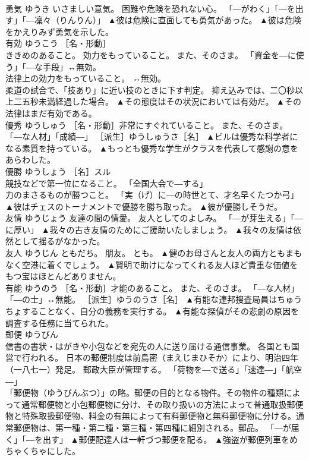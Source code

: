 \documentclass[8pt]{extreport}
\begin{document}
\begin{CJK}{UTF8}{min}
\\	勇気	ゆうき	いさましい意気。 困難や危険を恐れない心。 「―がわく」「―を出す」「―凜々（りんりん）」	▲彼は危険に直面しても勇気があった。 ▲彼は危険をかえりみず勇気を示した。
\\	有効	ゆうこう	［名・形動］ 
\\	ききめのあること。 効力をもっていること。 また、そのさま。 「資金を―に使う」「―な手段」↔無効。 
\\	法律上の効力をもっていること。 ↔無効。 
\\	柔道の試合で、「技あり」に近い技のときに下す判定。 抑え込みでは、二〇秒以上二五秒未満経過した場合。	▲その態度はその状況においては有効だ。 ▲その法律はまだ有効である。
\\	優秀	ゆうしゅう	［名・形動］非常にすぐれていること。 また、そのさま。 「―な人材」「成績―」 ［派生］ゆうしゅうさ［名］	▲ビルは優秀な科学者になる素質を持っている。 ▲もっとも優秀な学生がクラスを代表して感謝の意をあらわした。
\\	優勝	ゆうしょう	［名］スル 
\\	競技などで第一位になること。 「全国大会で―する」 
\\	力のまさるものが勝つこと。 「実（げ）に―の時世とて、才名早くたつか弓」	▲彼はチェスのトーナメントで優勝を勝ち取った。 ▲彼が優勝しそうだ。
\\	友情	ゆうじょう	友達の間の情愛。 友人としてのよしみ。 「―が芽生える」「―に厚い」	▲我々の古き友情のためにご援助いたしましょう。 ▲我々の友情は依然として揺るがなかった。
\\	友人	ゆうじん	ともだち。 朋友。 とも。	▲健のお母さんと友人の両方ともまもなく空港に着くでしょう。 ▲賢明で助けになってくれる友人ほど貴重な価値をもつ宝はほとんどありません。
\\	有能	ゆうのう	［名・形動］才能のあること。 また、そのさま。 「―な人材」「―の士」↔無能。 ［派生］ゆうのうさ［名］	▲有能な連邦捜査局員はちゅうちょすることなく、自分の義務を実行する。 ▲有能な探偵がその悲劇の原因を調査する任務に当てられた。
\\	郵便	ゆうびん	
\\	信書の書状・はがきや小包などを宛先の人に送り届ける通信事業。 各国とも国営で行われる。 日本の郵便制度は前島密（まえじまひそか）により、明治四年（一八七一）発足。 郵政大臣が管理する。 「荷物を―で送る」「速達―」「航空―」 
\\	「郵便物（ゆうびんぶつ）」の略。郵便の目的となる物件。その物件の種類によって通常郵便物と小包郵便物に分け、その取り扱いの方法によって普通取扱郵便物と特殊取扱郵便物、料金の有無によって有料郵便物と無料郵便物に分ける。通常郵便物は、第一種・第二種・第三種・第四種に細別される。郵品。 「―が届く」「―を出す」	▲郵便配達人は一軒づつ郵便を配る。 ▲強盗が郵便列車をめちゃくちゃにした。

\end{CJK}
\end{document}
